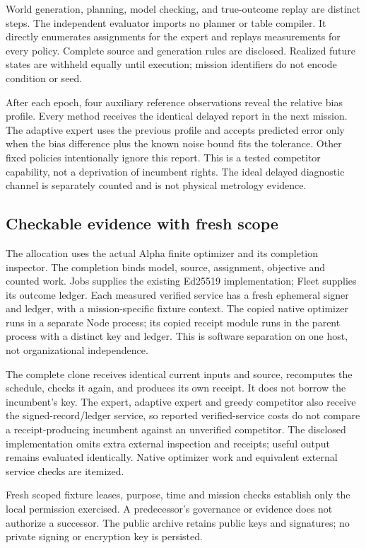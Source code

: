 World generation, planning, model checking, and true-outcome replay are distinct steps. The independent evaluator imports no planner or table compiler. It directly enumerates assignments for the expert and replays measurements for every policy. Complete source and generation rules are disclosed. Realized future states are withheld equally until execution; mission identifiers do not encode condition or seed.

After each epoch, four auxiliary reference observations reveal the relative bias profile. Every method receives the identical delayed report in the next mission. The adaptive expert uses the previous profile and accepts predicted error only when the bias difference plus the known noise bound fits the tolerance. Other fixed policies intentionally ignore this report. This is a tested competitor capability, not a deprivation of incumbent rights. The ideal delayed diagnostic channel is separately counted and is not physical metrology evidence.

\subsection{Checkable evidence with fresh scope}
The allocation uses the actual Alpha finite optimizer and its completion inspector. The completion binds model, source, assignment, objective and counted work. Jobs supplies the existing Ed25519 implementation; Fleet supplies its outcome ledger. Each measured verified service has a fresh ephemeral signer and ledger, with a mission-specific fixture context. The copied native optimizer runs in a separate Node process; its copied receipt module runs in the parent process with a distinct key and ledger. This is software separation on one host, not organizational independence.

The complete clone receives identical current inputs and source, recomputes the schedule, checks it again, and produces its own receipt. It does not borrow the incumbent's key. The expert, adaptive expert and greedy competitor also receive the signed-record/ledger service, so reported verified-service costs do not compare a receipt-producing incumbent against an unverified competitor. The disclosed implementation omits extra external inspection and receipts; useful output remains evaluated identically. Native optimizer work and equivalent external service checks are itemized.

Fresh scoped fixture leases, purpose, time and mission checks establish only the local permission exercised. A predecessor's governance or evidence does not authorize a successor. The public archive retains public keys and signatures; no private signing or encryption key is persisted.

